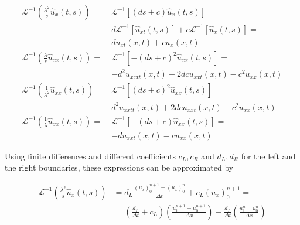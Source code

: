 \begin{equation}
	\begin{aligned}
    \mathcal{L}^{-1} \left( \frac{\lambda^2}{s} \hat{u}_x(t,s) \right) = & \mathcal{L}^{-1} \left[ (ds+c) \hat{u}_x(t,s) \right] = \\
    			 & d\mathcal{L}^{-1} \left[ \hat{u}_{xt}(t,s) \right] + c \mathcal{L}^{-1} \left[ \hat{u}_{x}(t,s) \right] = \\
    			 &   du_{xt}(x,t) + cu_x(x,t) \\
    \mathcal{L}^{-1} \left( \frac{\lambda}{s} \hat{u}_{xx}(t,s) \right) = & \mathcal{L}^{-1} \left[ -(ds+c)^2 \hat{u}_{xx}(t,s) \right] = \\
    			&  -d^2u_{xxtt}(x,t) -2dcu_{xxt}(x,t) - c^2u_{xx}(x,t) \\
    \mathcal{L}^{-1} \left( \frac{1}{\lambda^2} \hat{u}_{xx}(t,s) \right) = & \mathcal{L}^{-1} \left[ (ds+c)^2 \hat{u}_{xx}(t,s) \right] =\\
    			& d^2u_{xxtt}(x,t) + 2dcu_{xxt}(x,t) + c^2u_{xx}(x,t) \\
    \mathcal{L}^{-1} \left( \frac{1}{\lambda} \hat{u}_{xx}(t,s) \right) = & \mathcal{L}^{-1} \left[ -(ds+c) \hat{u}_{xx}(t,s) \right] =\\
    			& -du_{xxt}(x,t) - cu_{xx}(x,t)
    \end{aligned}
\end{equation}

\indent Using finite differences and different coefficients $c_L,c_R$ and $d_L,d_R$ for the left and the right boundaries, these expressions can be approximated by

\small

\begin{equation}
    \label{eq:FDorder2A}
    \begin{aligned}
    \mathcal{L}^{-1} \left( \frac{\lambda^2}{s} \hat{u}_x(t,s) \right) & =  d_L \frac{ (u_x)_0^{n+1} - (u_x)_0^n}{\Delta t} + c_L (u_x)_0^{n+1} = \\
    			& =  \left( \frac{d_L}{\Delta t} + c_L \right) \left( \frac{u_1^{n+1} - u_0^{n+1}}{\Delta x}\right) - \frac{d_L}{\Delta t} \left( \frac{u_1^{n} - u_0^{n}}{\Delta x}\right)
    \end{aligned}
 \end{equation}
 
